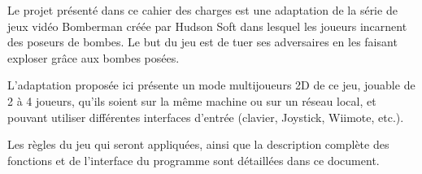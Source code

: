 Le projet présenté dans ce cahier des charges est une adaptation de la série de jeux vidéo Bomberman créée par Hudson Soft dans lesquel les joueurs incarnent des poseurs de bombes. Le but du jeu est de tuer ses adversaires en les faisant exploser grâce aux bombes posées.

L'adaptation proposée ici présente un mode multijoueurs 2D de ce jeu, jouable de 2 à 4 joueurs, qu'ils soient sur la même machine ou sur un réseau local, et pouvant utiliser différentes interfaces d'entrée (clavier, Joystick, Wiimote, etc.).

Les règles du jeu qui seront appliquées, ainsi que la description complète des fonctions et de l'interface du programme sont détaillées dans ce document.